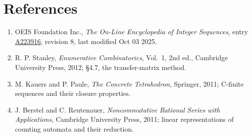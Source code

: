 \documentclass[11pt]{article}
\theoremstyle{definition}
\begin{document}
\section{References}

\begin{enumerate}

\item OEIS Foundation Inc., \emph{The On-Line Encyclopedia of Integer Sequences}, entry \href{https://oeis.org/A223916}{A223916}, revision 8, last modified Oct 03 2025.

\item R. P. Stanley, \emph{Enumerative Combinatorics}, Vol.~1, 2nd ed., Cambridge University Press, 2012; \S4.7, the transfer-matrix method.

\item M. Kauers and P. Paule, \emph{The Concrete Tetrahedron}, Springer, 2011; C-finite sequences and their closure properties.

\item J. Berstel and C. Reutenauer, \emph{Noncommutative Rational Series with Applications}, Cambridge University Press, 2011; linear representations of counting automata and their reduction.

\end{enumerate}
\end{document}
